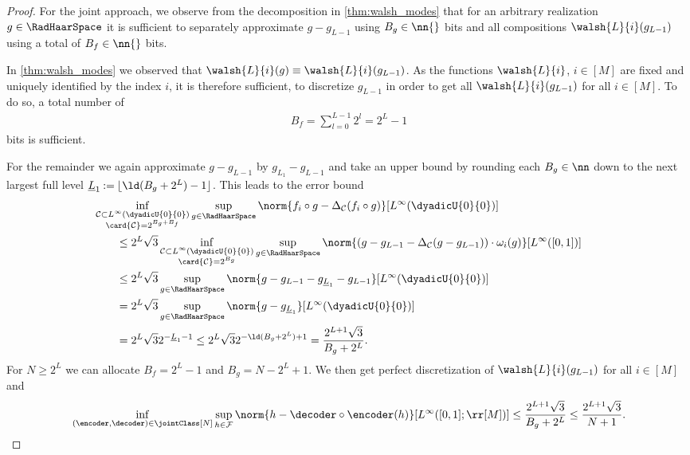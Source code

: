 \documentclass[twoside,11pt]{article}
\newcommand{\defeq}{\mathbin{:=}}
\newcommand{\set}[1]{\ensuremath{\mathcal{#1}}}
\begin{document}
\begin{proof}
For the joint approach, we observe from the decomposition in \cref{thm:walsh_modes} that for an arbitrary realization $g\in\RadHaarSpace$ it is sufficient to separately approximate $g-g_{L-1}$ using $B_g\in\nn{}$ bits and all compositions $\walsh{L}{i}(g_{L-1})$ using a total of $B_f\in\nn{}$ bits.

In \cref{thm:walsh_modes} we observed that $\walsh{L}{i}(g)\equiv \walsh{L}{i}(g_{L-1})$.
As the functions $\walsh{L}{i}$, $i\in[M]$ are fixed and uniquely identified by the index $i$, it is therefore sufficient, to discretize $g_{L-1}$ in order to get all $\walsh{L}{i}(g_{L-1})$ for all $i\in[M]$.
To do so, a total number of
\begin{align}
    B_f=\sum_{l=0}^{L-1}2^l=2^L-1
\end{align}
bits is sufficient.

For the remainder we again approximate $g-g_{L-1}$ by $g_{L_1}-g_{L-1}$ and take an upper bound by rounding each $B_g\in\nn$ down to the next largest full level $\underline{L}_1\defeq \lfloor \ld(B_g+2^L)-1\rfloor$.
This leads to the error bound
\begin{align}
    &\kern-2em\inf_{\substack{\set{C}\subset L^\infty(\dyadicU{0}{0})\\\card{\set{C}}=2^{B_g+B_f}}}\sup_{g\in\RadHaarSpace}\norm{f_i\circ g-\Delta_{\set{C}}(f_i\circ g)}[{L^\infty(\dyadicU{0}{0})}]
    \\&
    \leq
    2^L\sqrt{3}\inf_{\substack{\set{C}\subset L^\infty(\dyadicU{0}{0})\\\card{\set{C}}=2^{B_g}}}\sup_{g\in\RadHaarSpace}\norm{(g-g_{L-1}-\Delta_{\set{C}}(g-g_{L-1}))\cdot\omega_i(g)}[{L^\infty([0,1])}]
    \\&
    \leq
    2^L\sqrt{3}\sup_{g\in\RadHaarSpace}\norm{g-g_{L-1}-g_{\underline{L}_1}-g_{L-1}}[{L^\infty(\dyadicU{0}{0})}]
    \\&
    =
    2^L\sqrt{3}\sup_{g\in\RadHaarSpace}\norm{g-g_{\underline{L}_1}}[{L^\infty(\dyadicU{0}{0})}]
    \\&
    =
    2^L\sqrt{3}2^{-\underline{L}_1-1}
    \leq
    2^L\sqrt{3}2^{-\ld(B_g+2^L)+1}
    =
    \frac{2^{L+1}\sqrt{3}}{B_g+2^L}.
\end{align}
For $N\geq 2^L$ we can allocate $B_f=2^L-1$ and $B_g=N-2^L+1$.
We then get perfect discretization of $\walsh{L}{i}(g_{L-1})$ for all $i\in[M]$ and
\begin{align}
    \inf_{(\encoder,\decoder)\in\jointClass[N]}
    \sup_{h\in\set{F}}
    \norm{h-\decoder\circ\encoder(h)}[{L^\infty([0,1];\rr[M])}]
    \leq
    \frac{2^{L+1}\sqrt{3}}{B_g+2^L}
    \leq
    \frac{2^{L+1}\sqrt{3}}{N+1}.
\end{align}
\end{proof}
\end{document}
